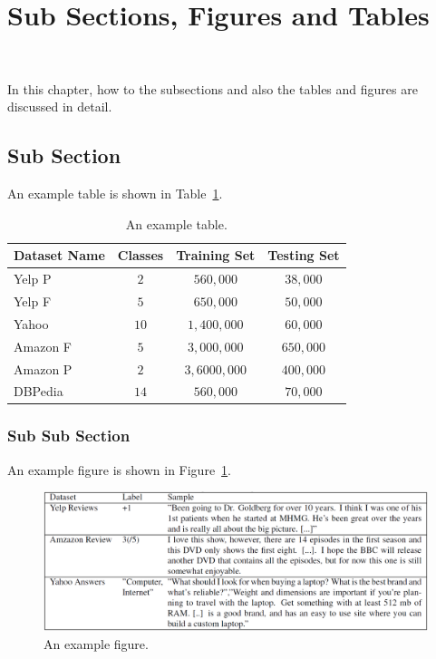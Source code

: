 \section{Sub Sections, Figures and Tables}~\label{sec:subsections}

In this chapter, how to the subsections and also the tables and figures are discussed in detail.

\subsection{Sub Section}\label{sec:subsection}
An example table is shown in Table~\ref{tab:dataset}.

\begin{table}[!ht]
\center
\caption{An example table.}
\label{tab:dataset}
\begin{tabular}{lccc}
\hline
Dataset Name& Classes & Training Set & Testing Set\\ \hline
Yelp P& $2$ & $560,000$ & $38,000$ \\
Yelp F& $5$ & $650,000$ & $50,000$ \\ 
Yahoo& $10$ & $1,400,000$ & $60,000$ \\  
Amazon F & $5$ & $3,000,000$& $650,000$ \\
Amazon P & $2$ & $3,6000,000$ & $400,000$ \\
DBPedia& $14$ & $560,000$ & $70,000$  \\
\hline
\end{tabular}
\end{table}


\subsubsection{Sub Sub Section}\label{sec:subsubsection}

An example figure is shown in Figure~\ref{fig:dataset}.

\begin{figure}[ht!]
    \centering
    \includegraphics[width=1\columnwidth]{figures/dataset.png}
    \caption{An example figure.}
    \label{fig:dataset}
    \vspace{-3mm}
\end{figure}

